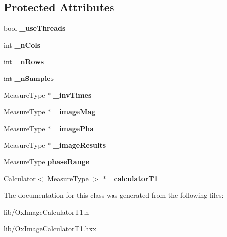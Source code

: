 \subsection*{Protected Attributes}
\begin{DoxyCompactItemize}
\item 
\hypertarget{class_ox_1_1_image_calculator_t1_af5f6e72b63b78a87a3723f4f2d71068f}{bool {\bfseries \-\_\-use\-Threads}}\label{class_ox_1_1_image_calculator_t1_af5f6e72b63b78a87a3723f4f2d71068f}

\item 
\hypertarget{class_ox_1_1_image_calculator_t1_a02ee85ff0ffd7cb5b1de9357ab23ce56}{int {\bfseries \-\_\-n\-Cols}}\label{class_ox_1_1_image_calculator_t1_a02ee85ff0ffd7cb5b1de9357ab23ce56}

\item 
\hypertarget{class_ox_1_1_image_calculator_t1_ab3db79a49b848f1a145e6fcbb9c29766}{int {\bfseries \-\_\-n\-Rows}}\label{class_ox_1_1_image_calculator_t1_ab3db79a49b848f1a145e6fcbb9c29766}

\item 
\hypertarget{class_ox_1_1_image_calculator_t1_af5655b9262c2634cc8b4ce0465682b0e}{int {\bfseries \-\_\-n\-Samples}}\label{class_ox_1_1_image_calculator_t1_af5655b9262c2634cc8b4ce0465682b0e}

\item 
\hypertarget{class_ox_1_1_image_calculator_t1_a6bc67b8020a51ecd2defd7ede1954b52}{Measure\-Type $\ast$ {\bfseries \-\_\-inv\-Times}}\label{class_ox_1_1_image_calculator_t1_a6bc67b8020a51ecd2defd7ede1954b52}

\item 
\hypertarget{class_ox_1_1_image_calculator_t1_ab43aaec5a7bae1246c96f366498c2130}{Measure\-Type $\ast$ {\bfseries \-\_\-image\-Mag}}\label{class_ox_1_1_image_calculator_t1_ab43aaec5a7bae1246c96f366498c2130}

\item 
\hypertarget{class_ox_1_1_image_calculator_t1_af804d044be29f0b554c68992d77f22ba}{Measure\-Type $\ast$ {\bfseries \-\_\-image\-Pha}}\label{class_ox_1_1_image_calculator_t1_af804d044be29f0b554c68992d77f22ba}

\item 
\hypertarget{class_ox_1_1_image_calculator_t1_a62bb966f944eae07d9873db02487f850}{Measure\-Type $\ast$ {\bfseries \-\_\-image\-Results}}\label{class_ox_1_1_image_calculator_t1_a62bb966f944eae07d9873db02487f850}

\item 
\hypertarget{class_ox_1_1_image_calculator_t1_a35e200233fd8e1ecdd88c8a74ae4c1d0}{Measure\-Type {\bfseries phase\-Range}}\label{class_ox_1_1_image_calculator_t1_a35e200233fd8e1ecdd88c8a74ae4c1d0}

\item 
\hypertarget{class_ox_1_1_image_calculator_t1_a1ba7f99a15c36c734abe8253cd0de4d5}{\hyperlink{class_ox_1_1_calculator}{Calculator}$<$ Measure\-Type $>$ $\ast$ {\bfseries \-\_\-calculator\-T1}}\label{class_ox_1_1_image_calculator_t1_a1ba7f99a15c36c734abe8253cd0de4d5}

\end{DoxyCompactItemize}


The documentation for this class was generated from the following files\-:\begin{DoxyCompactItemize}
\item 
lib/Ox\-Image\-Calculator\-T1.\-h\item 
lib/Ox\-Image\-Calculator\-T1.\-hxx\end{DoxyCompactItemize}
